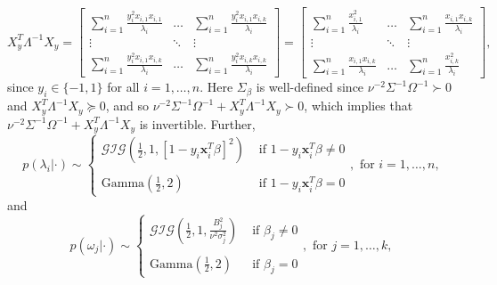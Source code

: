 \documentclass[12pt]{article}
\numberwithin{equation}{section}
\begin{document}
\begin{equation}
  X_{y}^T \Lambda^{-1} X_{y} = \begin{bmatrix}
    \sum_{i=1}^{n}\frac{y_i^2 x_{i,1}x_{i,1}}{\lambda_i} & \dots & \sum_{i=1}^{n}\frac{ y_i^2 x_{i,1}x_{i,k}}{\lambda_i} \\
    \vdots & \ddots & \vdots \\
    \sum_{i=1}^{n} \frac{y_i^2 x_{i,1}x_{i,k}}{\lambda_i} & \dots & \sum_{i=1}^{n}\frac{y_i^2 x_{i,k}x_{i,k}}{\lambda_i}
  \end{bmatrix} = \begin{bmatrix}
    \sum_{i=1}^{n}\frac{x_{i,1}^2}{\lambda_i} & \dots & \sum_{i=1}^{n}\frac{ x_{i,1}x_{i,k}}{\lambda_i} \\
    \vdots & \ddots & \vdots \\
    \sum_{i=1}^{n} \frac{x_{i,1}x_{i,k}}{\lambda_i} & \dots & \sum_{i=1}^{n}\frac{ x_{i,k}^2}{\lambda_i}
  \end{bmatrix},
  \label{xtlx}
\end{equation}
since $y_i \in \{-1,1\}$ for all $i = 1,\dots, n$. Here $\Sigma_{\beta}$ is well-defined since $\nu^{-2}\Sigma^{-1}\Omega^{-1} \succ 0$ and $X_{y}^T
\Lambda^{-1} X_{y} \succeq 0$, and so $\nu^{-2}\Sigma^{-1}\Omega^{-1} + X_{y}^T \Lambda^{-1} X_{y} \succ 0$, which implies that $\nu^{-2}\Sigma^{-1}\Omega^{-1} +
X_{y}^T \Lambda^{-1} X_{y}$ is invertible. Further,
\begin{equation}
  p(\lambda_i|\cdot) \sim \left\{ \begin{array}{cl}
      \mathcal{GIG}\left( \frac{1}{2}, 1, [1 - y_i \bm{x}_i^T\beta]^2 \right) & \text{ if } 1-y_i \bm{x}_i^T \beta \neq 0 \\ \\
      \text{Gamma}\left( \frac{1}{2}, 2 \right) & \text{ if } 1 - y_i\bm{x}_i^T\beta = 0
  \end{array} \right., \text{ for } i=1,\dots, n,
  \label{lcondit}
\end{equation}
and 
\begin{equation}
  p(\omega_j|\cdot) \sim \left\{ \begin{array}{cl}
      \mathcal{GIG}\left( \frac{1}{2}, 1, \frac{B_j^2}{\nu^2\sigma_j^2} \right) & \text{ if } \beta_j \neq 0 \\ \\
      \text{Gamma}\left( \frac{1}{2}, 2 \right) & \text{ if } \beta_j = 0
  \end{array} \right.,
  \text{ for } j=1,\dots,k,
  \label{wcondit}
\end{equation}
\end{document}
